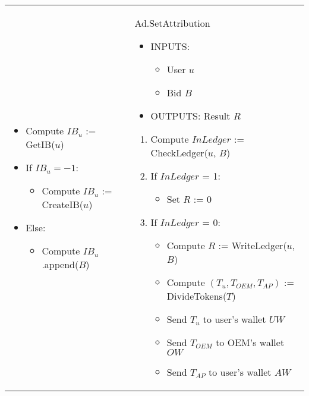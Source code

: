 \begin{table}[h]
\begin{tabular}{|p{}p{}|}
\begin{enumerate}
	\vspace{-0.3cm}
	\begin{itemize}
		\item Compute $IB_u$ := \textsf{GetIB}($u$)
		\item If $IB_u = -1$: 
		\begin{itemize}
			\item Compute $IB_u$ := \textsf{CreateIB}($u$)
		\end{itemize}
		\item Else:
		\begin{itemize}
		 \item Compute $IB_u$.\textsf{append}($B$)
		\end{itemize}
	\end{itemize}
\end{enumerate} & \vspace{0.1cm} \textsf{Ad.SetAttribution}
\begin{itemize}
	\vspace{-0.3cm}
	\item INPUTS:
	\vspace{-0.4cm}
	\begin{itemize}
		\item User $u$
		\item Bid $B$
	\end{itemize}
	\item OUTPUTS: Result $R$
\end{itemize}
\begin{enumerate}
	\item Compute $InLedger$ := \textsf{CheckLedger}($u$, $B$)
	\item If $InLedger$ = 1:
	\begin{itemize}
		\item Set $R$ := 0
	\end{itemize}
	\item If $InLedger$ = 0:
	\begin{itemize}
		\item Compute $R$ := \textsf{WriteLedger}($u$, $B$)
		\item Compute $(T_u, T_{OEM}, T_{AP})$ := \textsf{DivideTokens}($T$)
		\item Send $T_u$ to user's wallet $UW$
		\item Send $T_{OEM}$ to OEM's wallet $OW$
		\item Send $T_{AP}$ to user's wallet $AW$
	\end{itemize}
\end{enumerate} \\

\end{tabular}
\end{table}
